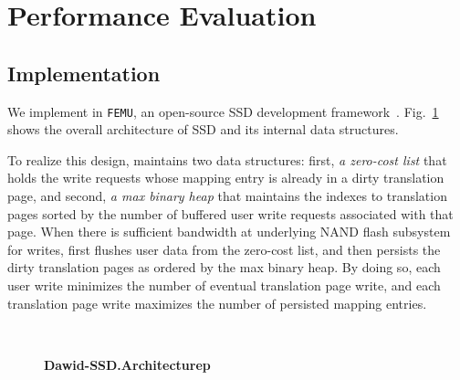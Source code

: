 \section{Performance Evaluation}


\subsection{Implementation}
We implement \ours{} in \texttt{FEMU}, an open-source SSD development
framework~\cite{li2018case}. 
Fig.~\ref{fig_dawid_archi} shows the overall architecture of \ours{} SSD and
its internal data structures. 

To realize this design,  
\ours{} maintains two data structures: first, \textit{a zero-cost list}  
that holds the write requests whose mapping entry is already in a dirty translation page,  
and second, \textit{a max binary heap} that maintains the indexes to translation pages 
sorted by the number of buffered user write requests associated with that page.  
When there is sufficient bandwidth at underlying NAND flash subsystem for writes,  
\ours{} first flushes user data from the  zero-cost list, 
and then persists the dirty translation pages as ordered by the max binary heap.  
By doing so, each user write minimizes the number of eventual translation page write,  
and each translation page write maximizes the number of persisted mapping entries. 

\begin{figure}[t]
    \centering{}
	 \\

    \caption{\textbf{Dawid-SSD.Architecturep}}
    \label{fig_dawid_archi}
\end{figure}






